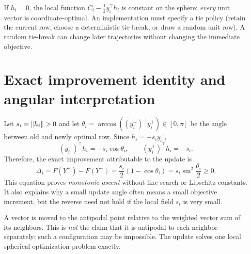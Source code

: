 \begin{definition}
If $h_i=0$, the local function $C_i-\tfrac12y_i^\top h_i$ is constant on the sphere: \emph{every} unit vector is coordinate-optimal. An implementation must specify a tie policy (retain the current row, choose a deterministic tie-break, or draw a random unit row). A random tie-break can change later trajectories without changing the immediate objective.
\end{definition}

\section{Exact improvement identity and angular interpretation}
Let $s_i=\left\lVert h_i\right\rVert>0$ and let $\theta_i=\arccos((y_i^-)^\top y_i^+)\in[0,\pi]$ be the angle between old and newly optimal row. Since $h_i=-s_iy_i^+$,
\[
(y_i^-)^\top h_i=-s_i\cos\theta_i,\qquad (y_i^+)^\top h_i=-s_i.
\]
Therefore, the exact improvement attributable to the update is
\begin{equation}\label{eq:eva-gain}
\boxed{\Delta_i=F(Y^+)-F(Y^-)=\frac{s_i}{2}(1-\cos\theta_i)=s_i\sin^2\frac{\theta_i}{2}\ge0.}
\end{equation}
This equation proves \emph{monotonic ascent} without line search or Lipschitz constants. It also explains why a small update angle often means a small objective increment, but the reverse need not hold if the local field $s_i$ is very small.

\begin{intuition}
A vector is moved to the antipodal point relative to the weighted vector sum of its neighbors. This is \emph{not} the claim that it is antipodal to each neighbor separately; such a configuration may be impossible. The update solves one local spherical optimization problem exactly.
\end{intuition}

